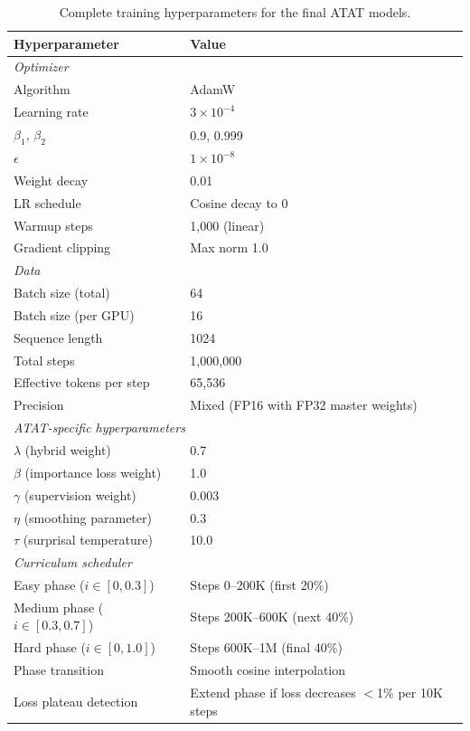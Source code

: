 \begin{table}[H]
\centering
\caption{Complete training hyperparameters for the final ATAT models.}
\label{tab:training-config}
\begin{tabular}{ll}
\toprule
\textbf{Hyperparameter} & \textbf{Value} \\
\midrule
\multicolumn{2}{l}{\textit{Optimizer}} \\
Algorithm & AdamW~\citep{adamw} \\
Learning rate & $3 \times 10^{-4}$ \\
$\beta_1$, $\beta_2$ & 0.9, 0.999 \\
$\epsilon$ & $1 \times 10^{-8}$ \\
Weight decay & 0.01 \\
LR schedule & Cosine decay to 0 \\
Warmup steps & 1,000 (linear) \\
Gradient clipping & Max norm 1.0 \\
\midrule
\multicolumn{2}{l}{\textit{Data}} \\
Batch size (total) & 64 \\
Batch size (per GPU) & 16 \\
Sequence length & 1024 \\
Total steps & 1,000,000 \\
Effective tokens per step & 65,536 \\
Precision & Mixed (FP16 with FP32 master weights) \\
\midrule
\multicolumn{2}{l}{\textit{ATAT-specific hyperparameters}} \\
$\lambda$ (hybrid weight) & 0.7 \\
$\beta$ (importance loss weight) & 1.0 \\
$\gamma$ (supervision weight) & 0.003 \\
$\eta$ (smoothing parameter) & 0.3 \\
$\tau$ (surprisal temperature) & 10.0 \\
\midrule
\multicolumn{2}{l}{\textit{Curriculum scheduler}} \\
Easy phase ($i \in [0, 0.3]$) & Steps 0--200K (first 20\%) \\
Medium phase ($i \in [0.3, 0.7]$) & Steps 200K--600K (next 40\%) \\
Hard phase ($i \in [0, 1.0]$) & Steps 600K--1M (final 40\%) \\
Phase transition & Smooth cosine interpolation \\
Loss plateau detection & Extend phase if loss decreases $<$1\% per 10K steps \\

\end{tabular}
\end{table}
